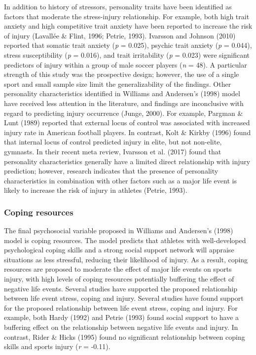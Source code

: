 \documentclass[
  english,
  man,floatsintext]{apa6}
\begin{document}
In addition to history of stressors, personality traits have been identified as factors that moderate the stress-injury relationship.
For example, both high trait anxiety and high competitive trait anxiety have been reported to increase the risk of injury (Lavallée \& Flint, 1996; Petrie, 1993).
Ivarsson and Johnson (2010) reported that somatic trait anxiety (\emph{p} = 0.025), psychic trait anxiety (\emph{p} = 0.044), stress susceptibility (\emph{p} = 0.016), and trait irritability (\emph{p} = 0.023) were significant predictors of injury within a group of male soccer players (\emph{n} = 48).
A particular strength of this study was the prospective design; however, the use of a single sport and small sample size limit the generalizability of the findings.
Other personality characteristics identified in Williams and Andersen's (1998) model have received less attention in the literature, and findings are inconclusive with regard to predicting injury occurrence (Junge, 2000).
For example, Pargman \& Lunt (1989) reported that external locus of control was associated with increased injury rate in American football players.
In contrast, Kolt \& Kirkby (1996) found that internal locus of control predicted injury in elite, but not non-elite, gymnasts.
In their recent meta review, Ivarsson et al. (2017) found that personality characteristics generally have a limited direct relationship with injury prediction; however, research indicates that the presence of personality characteristics in combination with other factors such as a major life event is likely to increase the risk of injury in athletes (Petrie, 1993).

\hypertarget{coping-resources}{%
\subsubsection{Coping resources}\label{coping-resources}}

The final psychosocial variable proposed in Williams and Andersen's (1998) model is coping resources.
The model predicts that athletes with well-developed psychological coping skills and a strong social support network will appraise situations as less stressful, reducing their likelihood of injury.
As a result, coping resources are proposed to moderate the effect of major life events on sports injury, with high levels of coping resources potentially buffering the effect of negative life events.
Several studies have supported the proposed relationship between life event stress, coping and injury.
Several studies have found support for the proposed relationship between life event stress, coping and injury. For example, both Hardy (1992) and Petrie (1993) found social support to have a buffering effect on the relationship between negative life events and injury.
In contrast, Rider \& Hicks (1995) found no significant relationship between coping skills and sports injury (\emph{r} = -0.11).
\end{document}
